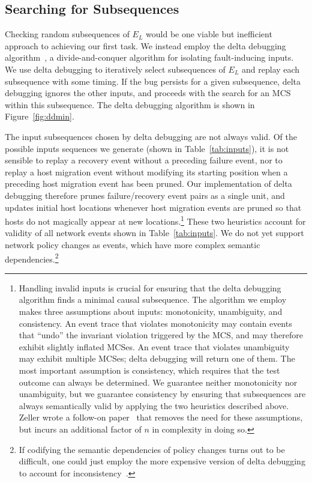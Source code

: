\subsection{Searching for Subsequences}
\label{subsec:delta_debugging}

Checking random subsequences of $E_L$ would be one viable but inefficient
approach to achieving our first task. We instead employ
the delta debugging algorithm~\cite{Zeller:1999:YMP:318773.318946}, a
divide-and-conquer algorithm for
isolating fault-inducing inputs. We use delta
debugging to iteratively select subsequences of $E_L$ and replay each
subsequence with some timing. If the bug persists for a given subsequence, delta debugging ignores the
other inputs, and proceeds with the search for an MCS within this subsequence.
The delta debugging algorithm is shown in Figure~\ref{fig:ddmin}.

The input subsequences chosen by delta debugging are not always
valid. Of the possible inputs sequences we generate (shown in
Table~\ref{tab:inputs}), it is not sensible to replay a recovery event without a
preceding failure event, nor to replay a host migration
event without modifying its starting position when a preceding host
migration event has been pruned. Our implementation of delta debugging
therefore prunes failure/recovery event pairs as a single unit, and updates initial host locations
whenever host migration events are pruned so that hosts do not magically appear at new
locations.\footnote{Handling invalid inputs is crucial for
ensuring that the delta debugging algorithm finds a minimal causal
subsequence. The algorithm we employ~\cite{Zeller:1999:YMP:318773.318946}
makes three
assumptions about inputs: monotonicity, unambiguity, and consistency.
An event trace that violates monotonicity may contain events that ``undo'' the
invariant violation triggered by the MCS, and may therefore exhibit slightly
inflated MCSes. An event trace that violates unambiguity may exhibit multiple MCSes; delta debugging
will return one of them. The most important assumption is consistency, which
requires that the test outcome can always be determined.
We guarantee neither monotonicity nor unambiguity, but we guarantee consistency by
ensuring that subsequences are always semantically valid by applying the two
heuristics described above. Zeller wrote a follow-on
paper~\cite{Zeller:2002:SIF:506201.506206} that removes the need for these
assumptions, but incurs an additional factor of $n$ in complexity in doing so.}
These two heuristics account for validity of all network
events shown in Table~\ref{tab:inputs}. We do not yet
support network policy changes as events, which have more complex semantic
dependencies.\footnote{If codifying the semantic dependencies of
policy changes turns out to be difficult, one could just employ the more
expensive version of delta debugging to account for
inconsistency~\cite{Zeller:2002:SIF:506201.506206}.}

